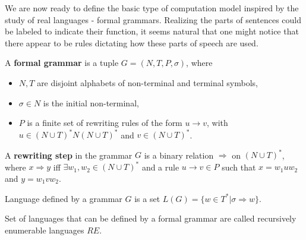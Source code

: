 We are now ready to define the basic type of computation model inspired by the study of real languages - formal grammars. Realizing the parts of sentences could be labeled to indicate their function, it seems natural that one might notice that there appear to be rules dictating how these parts of speech are used.
\begin{definition}
A  {\bf formal grammar} is a tuple $G = (N,T,P,\sigma)$, where
\begin{itemize}
  \item $N, T$ are disjoint alphabets of non-terminal and terminal symbols,
  \item $\sigma\in N$ is the initial non-terminal,
  \item $P$ is a finite set of rewriting rules of the form $u\rightarrow v$, with $u\in (N\cup T)^*N(N\cup T)^*$ and $v\in (N\cup T)^*$.
\end{itemize}
\end{definition}

\begin{definition}
A {\bf rewriting step} in the grammar $G$ is a binary relation $\Rightarrow$ on $(N\cup T)^*$, where $x\Rightarrow y$ iff $\exists w_1, w_2\in (N\cup T)^*$ and a rule $u\rightarrow v \in P$ such that $x=w_1uw_2$ and $y=w_1vw_2$.
\end{definition}

\begin{definition}
 Language defined by a grammar $G$ is a set $L(G)=\{w\in T^*|\sigma\Rightarrow w\}$.
\end{definition}

Set of languages that can be defined by a formal grammar are called  recursively enumerable languages $RE$.
